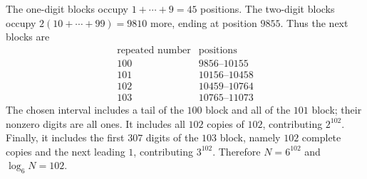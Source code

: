 The one-digit blocks occupy $1+\cdots+9=45$ positions. The two-digit blocks occupy $2(10+\cdots+99)=9810$ more, ending at position $9855$. Thus the next blocks are
\[
\begin{array}{c|c}
\text{repeated number}&\text{positions}\\\hline
100&9856\text{--}10155\\
101&10156\text{--}10458\\
102&10459\text{--}10764\\
103&10765\text{--}11073
\end{array}
\]
The chosen interval includes a tail of the $100$ block and all of the $101$ block; their nonzero digits are all ones. It includes all $102$ copies of $102$, contributing $2^{102}$. Finally, it includes the first $307$ digits of the $103$ block, namely $102$ complete copies and the next leading $1$, contributing $3^{102}$. Therefore $N=6^{102}$ and $\boxed{\log_6N=102}$.
